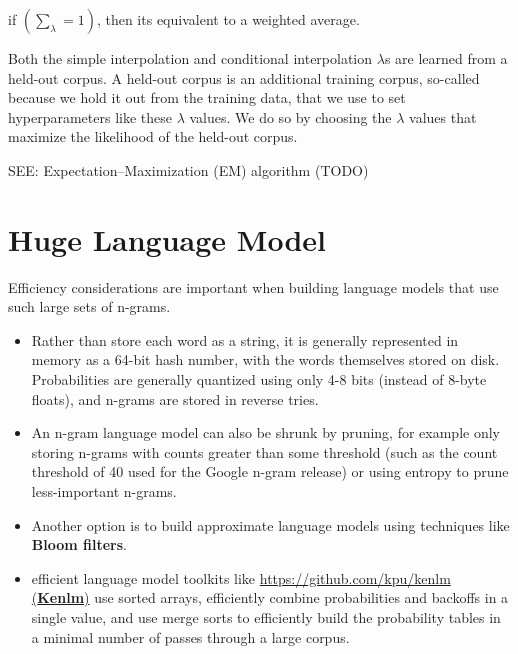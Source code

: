 if \( \left( \sum_\lambda = 1 \right)\), then its equivalent to a weighted average.

Both the simple interpolation and conditional interpolation $\lambda$s are learned from a held-out corpus. A held-out corpus is an additional training corpus, so-called because we hold it out from the training data, that we use to set hyperparameters like these $\lambda$ values. We do so by choosing the $\lambda$ values that maximize the likelihood of the held-out corpus.

SEE: Expectation–Maximization (EM) algorithm (TODO)


\section{Huge Language Model}
Efficiency considerations are important when building language models that use such large sets of n-grams. 
\begin{itemize}
    \item Rather than store each word as a string, it is generally represented in memory as a 64-bit hash number, with the words themselves stored on disk. Probabilities are generally quantized using only 4-8 bits (instead of 8-byte floats), and n-grams are stored in reverse tries.
    \item An n-gram language model can also be shrunk by pruning, for example only storing n-grams with counts greater than some threshold (such as the count threshold of 40 used for the Google n-gram release) or using entropy to prune less-important n-grams.
    \item Another option is to build approximate language models using techniques like \textbf{Bloom filters}.
    \item efficient language model toolkits like \href{https://github.com/kpu/kenlm}{https://github.com/kpu/kenlm (\textbf{Kenlm})} use sorted arrays, efficiently combine probabilities and backoffs in a single value, and use merge sorts to efficiently build the probability tables in a minimal number of passes through a large corpus.
\end{itemize}












































